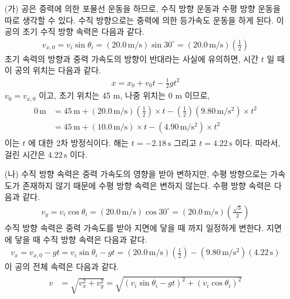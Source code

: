 \documentclass[APS,floatfix,nofootinbib,superscriptaddress,fleqn,preprint]{revtex4}
\begin{document}
\begin{itemize}
  \item[(가)]공은 중력에 의한 포물선 운동을 하므로, 수직 방향 운동과
  수평 방향 운동을 따로 생각할 수 있다. 수직 방향으로는 중력에 의한 등가속도 운동을 하게 된다.
  이 공의 초기 수직 방향 속력은 다음과 같다.
  \begin{align}
    v_{x,0}=v_i\sin{\theta_i}=(20.0\,\mathrm{m/s})\sin{30^\circ}
    =(20.0\,\mathrm{m/s})\left(\frac{1}{2}\right)
  \end{align}
  초기 속력의 방향과 중력 가속도의 방향이 반대라는 사실에 유의하면, 
  시간 $t$ 일 때 이 공의 위치는 다음과 같다.
  \begin{align}
    x=x_0+v_0t-\frac{1}{2}gt^2
  \end{align}
  $v_0=v_{x,0}$ 이고, 초기 위치는 45 m, 나중 위치는 0 m 이므로,
  \begin{align}
    \begin{split} 
      0\,\mathrm{m}&=45\,\mathrm{m}+(20.0\,\mathrm{m/s})
      \left(\frac{1}{2}\right)\times t
      -\left(\frac{1}{2}\right)
      (9.80\,\mathrm{m/s^2})\times t^2 \\
      &=45\,\mathrm{m}+(10.0\,\mathrm{m/s})\times t
      -(4.90\,\mathrm{m/s^2})\times t^2
    \end{split}
  \end{align}
  이는 $t$ 에 대한 2차 방정식이다. 해는 $t=-2.18\,\mathrm{s} $ 
  그리고 $t=4.22\,\mathrm{s}$ 이다. 
  따라서, 걸린 시간은 $4.22\,\mathrm{s}$ 이다.
  \item[(나)] 수직 방향 속력은 중력 가속도의 영향을 받아 변하지만, 
  수평 방향으로는 가속도가 존재하지 않기 때문에 수평 방향 속력은 
  변하지 않는다. 수평 방향 속력은 다음과 같다.
  \begin{align}
    v_y=v_i\cos{\theta_i}=(20.0\,\mathrm{m/s})\cos{30^\circ}
    =(20.0\,\mathrm{m/s})\left(\frac{\sqrt{3}}{2}\right)
  \end{align}
  수직 방향 속력은 중력 가속도를 받아 지면에 닿을 때 까지 일정하게 변한다. 
  지면에 닿을 때 수직 방향 속력은 다음과 같다.
  \begin{align}
    v_x=v_{x,0}-gt=v_i\sin{\theta_i}-gt
    =(20.0\,\mathrm{m/s})\left(\frac{1}{2}\right)
    -(9.80\,\mathrm{m/s^2})(4.22\,\mathrm{s})
  \end{align}
  이 공의 전체 속력은 다음과 같다.
  \begin{align}
    \begin{split}
      v&=\sqrt{v_x^2+v_y^2}=\sqrt{{(v_i\sin{\theta_i}-gt)}^2+{(v_i\cos{\theta_i})}^2} \\

\end{split}
\end{align}
\end{itemize}
\end{document}
